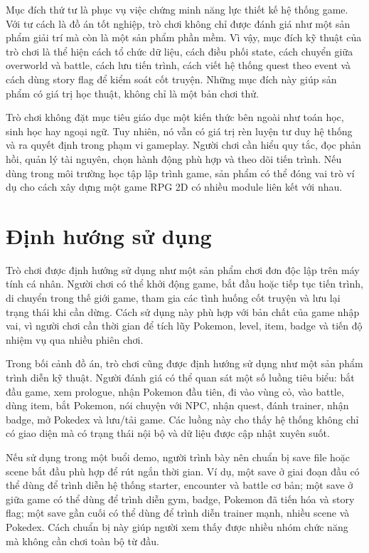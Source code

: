 Mục đích thứ tư là phục vụ việc chứng minh năng lực thiết kế hệ thống game. Với tư cách là đồ án tốt nghiệp, trò chơi không chỉ được đánh giá như một sản phẩm giải trí mà còn là một sản phẩm phần mềm. Vì vậy, mục đích kỹ thuật của trò chơi là thể hiện cách tổ chức dữ liệu, cách điều phối state, cách chuyển giữa overworld và battle, cách lưu tiến trình, cách viết hệ thống quest theo event và cách dùng story flag để kiểm soát cốt truyện. Những mục đích này giúp sản phẩm có giá trị học thuật, không chỉ là một bản chơi thử.

Trò chơi không đặt mục tiêu giáo dục một kiến thức bên ngoài như toán học, sinh học hay ngoại ngữ. Tuy nhiên, nó vẫn có giá trị rèn luyện tư duy hệ thống và ra quyết định trong phạm vi gameplay. Người chơi cần hiểu quy tắc, đọc phản hồi, quản lý tài nguyên, chọn hành động phù hợp và theo dõi tiến trình. Nếu dùng trong môi trường học tập lập trình game, sản phẩm có thể đóng vai trò ví dụ cho cách xây dựng một game RPG 2D có nhiều module liên kết với nhau.

\section{Định hướng sử dụng}

Trò chơi được định hướng sử dụng như một sản phẩm chơi đơn độc lập trên máy tính cá nhân. Người chơi có thể khởi động game, bắt đầu hoặc tiếp tục tiến trình, di chuyển trong thế giới game, tham gia các tình huống cốt truyện và lưu lại trạng thái khi cần dừng. Cách sử dụng này phù hợp với bản chất của game nhập vai, vì người chơi cần thời gian để tích lũy Pokemon, level, item, badge và tiến độ nhiệm vụ qua nhiều phiên chơi.

Trong bối cảnh đồ án, trò chơi cũng được định hướng sử dụng như một sản phẩm trình diễn kỹ thuật. Người đánh giá có thể quan sát một số luồng tiêu biểu: bắt đầu game, xem prologue, nhận Pokemon đầu tiên, đi vào vùng cỏ, vào battle, dùng item, bắt Pokemon, nói chuyện với NPC, nhận quest, đánh trainer, nhận badge, mở Pokedex và lưu/tải game. Các luồng này cho thấy hệ thống không chỉ có giao diện mà có trạng thái nội bộ và dữ liệu được cập nhật xuyên suốt.

Nếu sử dụng trong một buổi demo, người trình bày nên chuẩn bị save file hoặc scene bắt đầu phù hợp để rút ngắn thời gian. Ví dụ, một save ở giai đoạn đầu có thể dùng để trình diễn hệ thống starter, encounter và battle cơ bản; một save ở giữa game có thể dùng để trình diễn gym, badge, Pokemon đã tiến hóa và story flag; một save gần cuối có thể dùng để trình diễn trainer mạnh, nhiều scene và Pokedex. Cách chuẩn bị này giúp người xem thấy được nhiều nhóm chức năng mà không cần chơi toàn bộ từ đầu.

